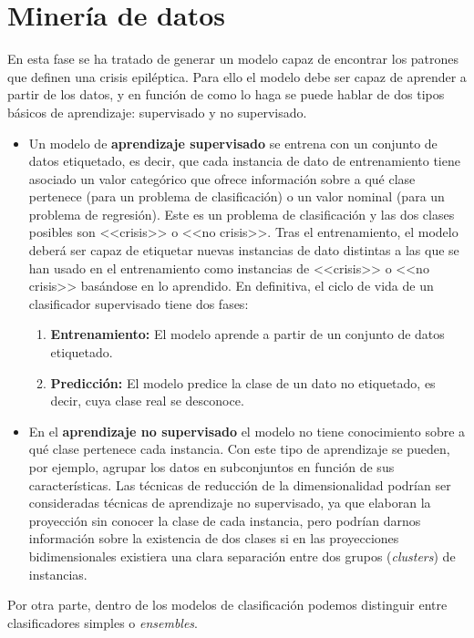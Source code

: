 \section{Minería de datos}

En esta fase se ha tratado de generar un modelo capaz de encontrar los patrones que definen una crisis epiléptica. Para ello el modelo debe ser capaz de aprender a partir de los datos, y en función de como lo haga se puede hablar de dos tipos básicos de aprendizaje: supervisado y no supervisado. 

\begin{itemize}
	\item Un modelo de \textbf{aprendizaje supervisado} se entrena con un conjunto de datos etiquetado, es decir, que cada instancia de dato de entrenamiento tiene asociado un valor categórico que ofrece información sobre a qué clase pertenece (para un problema de clasificación) o un valor nominal (para un problema de regresión). Este es un problema de clasificación y las dos clases posibles son <<crisis>> o <<no crisis>>. Tras el entrenamiento, el modelo deberá ser capaz de etiquetar nuevas instancias de dato distintas a las que se han usado en el entrenamiento como instancias de <<crisis>> o <<no crisis>> basándose en lo aprendido. En definitiva, el ciclo de vida de un clasificador supervisado tiene dos fases: 
	\begin{enumerate}
		\item \textbf{Entrenamiento:} El modelo aprende a partir de un conjunto de datos etiquetado. 
		\item \textbf{Predicción:} El modelo predice la clase de un dato no etiquetado, es decir, cuya clase real se desconoce. 
	\end{enumerate}
	
	\item En el \textbf{aprendizaje no supervisado} el modelo no tiene conocimiento sobre a qué clase pertenece cada instancia. Con este tipo de aprendizaje se pueden, por ejemplo, agrupar los datos en subconjuntos en función de sus características. Las técnicas de reducción de la dimensionalidad podrían ser consideradas técnicas de aprendizaje no supervisado, ya que elaboran la proyección sin conocer la clase de cada instancia, pero podrían darnos información sobre la existencia de dos clases si en las proyecciones bidimensionales existiera una clara separación entre dos grupos (\textit{clusters}) de instancias. 
\end{itemize}

Por otra parte, dentro de los modelos de clasificación podemos distinguir entre clasificadores simples o \textit{ensembles}.

